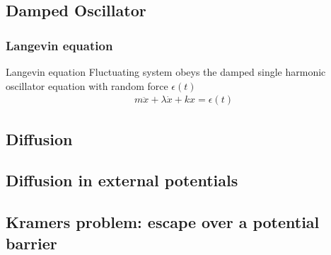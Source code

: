 \documentclass[12pt,a4paper]{article}
\begin{document}
    \subsection{Damped Oscillator}
        \subsubsection{Langevin equation}
            \begin{theorem}{Langevin equation}
                {
                Fluctuating system obeys the damped single harmonic oscillator equation with random force $\epsilon(t)$
                \begin{align*}
                    m\ddot{x}+\lambda\dot{x}+kx=\epsilon(t)
                \end{align*}
                }
            \end{theorem}
    \subsection{Diffusion}
    \subsection{Diffusion in external potentials}
    \subsection{Kramers problem: escape over a potential barrier}
\end{document}

